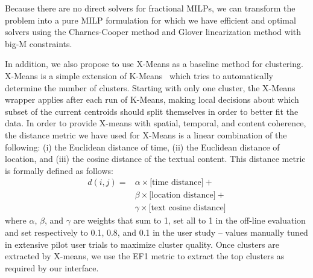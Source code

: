 Because there are no direct solvers for fractional MILPs, we can transform the problem into a pure MILP formulation for which we have efficient and optimal solvers using the Charnes-Cooper method \cite{Charnes1962} and Glover linearization method \cite{Glover1975} with big-M constraints.  




 
 In addition, we also propose to use X-Means \cite{Pelleg2000} as a baseline method for clustering. X-Means is a simple extension of K-Means~\cite{kmeans_original} which tries to  automatically determine the number of clusters. Starting with only one cluster, the X-Means wrapper applies after each run of K-Means, making local decisions about which subset of the current centroids should split themselves in order to better fit the data.  In order to provide X-means with spatial, temporal, and content coherence, the distance metric we have used for X-Means is a linear combination of the following: (i) the Euclidean distance of time, (ii) the Euclidean distance of location, and (iii) the cosine distance of the textual content. This distance metric is formally defined as follows:
\begin{equation}
\begin{array}{ll}
d(i,j)= & \alpha\times\textrm{[time distance]} +\\
& \beta\times\textrm{[location distance]}+\\
 & \gamma\times\textrm{[text cosine distance]}
\end{array}
\end{equation}
\noindent where $\alpha$, $\beta$, and $\gamma$ are weights that sum to 1, set all to 1 in the off-line evaluation and set respectively to 0.1, 0.8,  and 0.1 in the user study -- values manually tuned in extensive pilot user trials to maximize cluster quality.  Once clusters are extracted by X-means, we use the EF1 metric to extract the top clusters as required by our interface.






